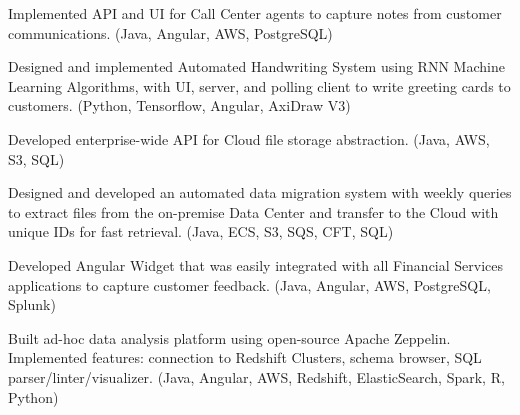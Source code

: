 \documentclass[letterpaper]{deedy-resume-openfont} %
\begin{document}
\begin{minipage}[t]{0.7\textwidth}
\sectionsep %


\begin{tightemize}
\item Implemented API and UI for Call Center agents to capture notes from customer communications. (Java, Angular, AWS, PostgreSQL)
\item Designed and implemented Automated Handwriting System using RNN Machine Learning Algorithms, with UI, server, and polling client to write greeting cards to customers. (Python, Tensorflow, Angular, AxiDraw V3)
\item Developed enterprise-wide API for Cloud file storage abstraction. (Java, AWS, S3, SQL)
\item Designed and developed an automated data migration system with weekly queries to extract files from the on-premise Data Center and transfer to the Cloud with unique IDs for fast retrieval. (Java, ECS, S3, SQS, CFT, SQL)
\end{tightemize}

\sectionsep %


\begin{tightemize}
\item Developed Angular Widget that was easily integrated with all Financial Services applications to capture customer feedback. (Java, Angular, AWS, PostgreSQL, Splunk)
\item Built ad-hoc data analysis platform using open-source Apache Zeppelin. Implemented features: connection to Redshift Clusters, schema browser, SQL parser/linter/visualizer. (Java, Angular, AWS, Redshift, ElasticSearch, Spark, R, Python)
\end{tightemize}

\sectionsep %



\end{minipage} %

\end{document}
